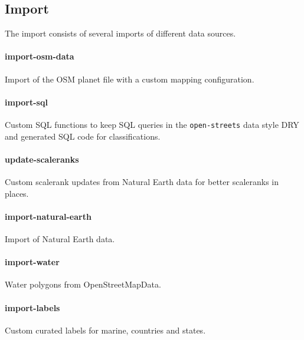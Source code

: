 \newpage
\subsection{Import}

The import consists of several imports of different data sources.

\paragraph{import-osm-data}
Import of the OSM planet file with a custom mapping configuration.

\paragraph{import-sql}
Custom SQL functions to keep SQL queries in the \texttt{open-streets} data style DRY and generated SQL code for classifications. 

\paragraph{update-scaleranks}
Custom scalerank updates from Natural Earth data for better scaleranks in places.

\paragraph{import-natural-earth}
Import of Natural Earth data.

\paragraph{import-water}
Water polygons from OpenStreetMapData.

\paragraph{import-labels}
Custom curated labels for marine, countries and states.

